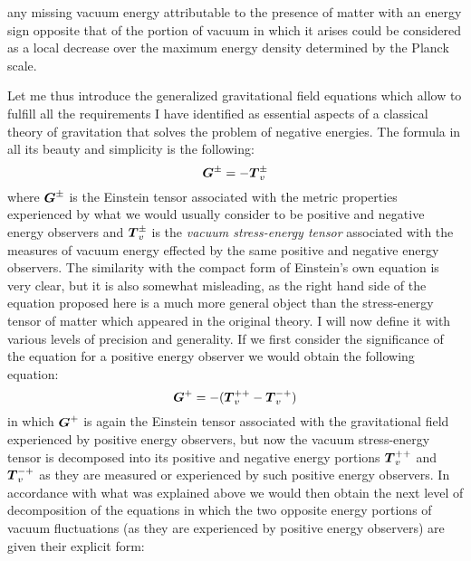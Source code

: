 \documentclass[notitlepage,12pt]{report}
\newcommand{\bm}[1]{\mbox{\boldmath $#1$}}
\begin{document}
any missing vacuum energy attributable to the presence of matter with an energy sign opposite that of the portion of vacuum in which it arises could be considered as a local decrease over the maximum energy density determined by the Planck scale.

Let me thus introduce the generalized gravitational field equations which allow to fulfill all the requirements I have identified as essential aspects of a classical theory of gravitation that solves the problem of negative energies. The formula in all its beauty and simplicity is the following:
\begin{equation}\label{eq:2.10}
\bm{G}^{\pm}=-\bm{T}_v^{\pm}
\end{equation}
where $\bm{G}^{\pm}$ is the Einstein tensor associated with the metric properties experienced by what we would usually consider to be positive and negative energy observers and $\bm{T}_v^{\pm}$ is the \textit{vacuum stress-energy tensor} associated with the measures of vacuum energy effected by the same positive and negative energy observers. The similarity with the compact form of Einstein's own equation is very clear, but it is also somewhat misleading, as the right hand side of the equation proposed here is a much more general object than the stress-energy tensor of matter which appeared in the original theory. I will now define it with various levels of precision and generality. If we first consider the significance of the equation for a positive energy observer we would obtain the following equation:
\begin{equation}\label{eq:2.11}
\bm{G}^+=-(\bm{T}_v^{++}-\bm{T}_v^{-+})
\end{equation}
in which $\bm{G}^+$ is again the Einstein tensor associated with the gravitational field experienced by positive energy observers, but now the vacuum stress-energy tensor is decomposed into its positive and negative energy portions $\bm{T}_v^{++}$ and $\bm{T}_v^{-+}$ as they are measured or experienced by such positive energy observers. In accordance with what was explained above we would then obtain the next level of decomposition of the equations in which the two opposite energy portions of vacuum fluctuations (as they are experienced by positive energy observers) are given their explicit form:
\end{document}
